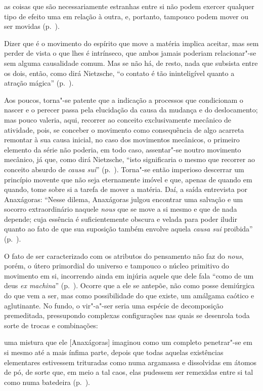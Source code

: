 \begin{hedraquote} 
as coisas que
são necessariamente estranhas entre si não podem exercer qualquer tipo
de efeito uma em relação à outra, e, portanto, tampouco podem mover ou
ser movidas (p.~\pageref{coisasquesao}).
\end{hedraquote} 

Dizer que é o
movimento do espírito que move a matéria implica aceitar, mas sem
perder de vista o que lhes é intrínseco, que ambos jamais poderiam
relacionar"-se sem alguma causalidade comum. Mas se não há, de resto,
nada que subsista entre os dois, então, como dirá Nietzsche,
``o contato é tão ininteligível quanto a atração
mágica'' (p.~\pageref{ocontatoe}).

Aos poucos, torna"-se patente que a indicação a processos que condicionam
o nascer e o perecer passa pela elucidação da causa da mudança e do
deslocamento; mas pouco valeria, aqui, recorrer ao conceito
exclusivamente mecânico de atividade, pois, se conceber o movimento
como consequência de algo acarreta remontar à sua causa inicial, no
caso dos movimentos mecânicos, o primeiro elemento da série não
poderia, em todo caso, assentar"-se noutro movimento mecânico, já que,
como dirá Nietzsche, ``isto significaria o mesmo que
recorrer ao conceito absurdo de \textit{causa
sui}'' (p.~\pageref{causasui}). Torna"-se então
imperioso descerrar um princípio movente que não seja eternamente
imóvel e que, apenas de quando em quando, tome sobre si a tarefa de
mover a matéria. Daí, a saída entrevista por Anaxágoras:
``Nesse dilema, Anaxágoras julgou encontrar uma salvação e
um socorro extraordinário naquele \textit{nous} que se move a si mesmo
e que de nada depende; cuja essência é suficientemente obscura e velada
para poder iludir quanto ao fato de que sua suposição também envolve
aquela \textit{causa sui} proibida'' (p.~\pageref{nessedilema}).

O fato de ser caracterizado com os atributos do pensamento não faz do
\textit{nous}, porém,\textit{ }o útero primordial do universo e
tampouco o núcleo primitivo do movimento em si, incorrendo ainda em
injúria aquele que dele fala ``como de um deus \textit{ex
machina}'' (p.~\pageref{exmachina}). Ocorre que a ele
se antepõe, não como posse demiúrgica do que vem a ser, mas como
possibilidade do que existe, um amálgama caótico e aglutinante. No
fundo, o vir"-a"-ser seria uma espécie de decomposição premeditada,
pressupondo complexas configurações nas quais se desenrola toda sorte
de trocas e combinações: 
\begin{hedraquote} 
uma mistura que ele
[Anaxágoras] imaginou como um completo penetrar"-se em si mesmo até a
mais ínfima parte, depois que todas aquelas existências elementares
estivessem trituradas como numa argamassa e dissolvidas em átomos de
pó, de sorte que, em meio a tal caos, elas pudessem ser remexidas entre
si tal como numa batedeira (p.~\pageref{mistura}).
\end{hedraquote} 

